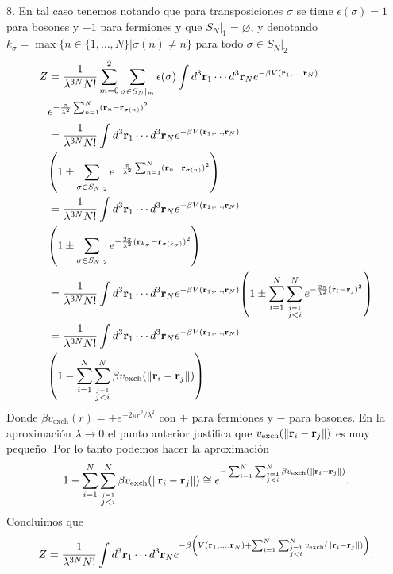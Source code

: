 \documentclass{article}
\begin{document}
8. En tal caso tenemos notando que para transposiciones $\sigma$ se tiene $\epsilon(\sigma)=1$ para bosones y $-1$ para fermiones y que $S_N|_1=\varnothing$, y denotando $k_\sigma=\max\{n\in\{1,\dots,N\}|\sigma(n)\neq n\}$ para todo $\sigma\in S_N|_2$
\begin{align}
\begin{split}
Z&=\frac{1}{\lambda^{3N}N!}\sum_{m=0}^2\sum_{\sigma\in S_N|_m}\epsilon(\sigma)\int d^3\vb{r}_1\cdots d^3\vb{r}_N e^{-\beta V(\vb{r}_1,\dots,\vb{r}_N)}\\
&e^{-\frac{\pi}{\lambda^2}\sum_{n=1}^N(\vb{r}_n-\vb{r}_{\sigma(n)})^2}\\
&=\frac{1}{\lambda^{3N}N!}\int d^3\vb{r}_1\cdots d^3\vb{r}_N e^{-\beta V(\vb{r}_1,\dots,\vb{r}_N)}\\
&\qty(1\pm\sum_{\sigma\in S_N|_2}e^{-\frac{\pi}{\lambda^2}\sum_{n=1}^N(\vb{r}_n-\vb{r}_{\sigma(n)})^2})\\
&=\frac{1}{\lambda^{3N}N!}\int d^3\vb{r}_1\cdots d^3\vb{r}_N e^{-\beta V(\vb{r}_1,\dots,\vb{r}_N)}\\
&\qty(1\pm\sum_{\sigma\in S_N|_2} e^{-\frac{2\pi}{\lambda^2}(\vb{r}_{k_\sigma}-\vb{r}_{\sigma(k_\sigma)})^2})\\
&=\frac{1}{\lambda^{3N}N!}\int d^3\vb{r}_1\cdots d^3\vb{r}_N e^{-\beta V(\vb{r}_1,\dots,\vb{r}_N)}\qty(1\pm\sum_{i=1}^N\sum_{\overset{j=1}{j<i}}^N e^{-\frac{2\pi}{\lambda^2}(\vb{r}_i-\vb{r}_j)^2})\\
&=\frac{1}{\lambda^{3N}N!}\int d^3\vb{r}_1\cdots d^3\vb{r}_N e^{-\beta V(\vb{r}_1,\dots,\vb{r}_N)}\\
&\qty(1-\sum_{i=1}^N\sum_{\overset{j=1}{j<i}}^N \beta v_{\text{exch}}(\|\vb{r}_i-\vb{r}_j\|))\\
\end{split}
\end{align}
Donde $\beta v_{\text{exch}}(r)=\pm e^{-2\pi r^2/\lambda^2}$ con $+$ para fermiones y $-$ para bosones. En la aproximación $\lambda\rightarrow 0$ el punto anterior justifica que $v_{\text{exch}}(\|\vb{r}_i-\vb{r}_j\|)$ es muy pequeño. Por lo tanto podemos hacer la aproximación
\begin{equation}
1-\sum_{i=1}^N\sum_{\overset{j=1}{j<i}}^N \beta v_{\text{exch}}(\|\vb{r}_i-\vb{r}_j\|)\cong e^{-\sum_{i=1}^N\sum_{\overset{j=1}{j<i}}^N \beta v_{\text{exch}}(\|\vb{r}_i-\vb{r}_j\|)}.
\end{equation}
Concluimos que 
\begin{equation}
Z=\frac{1}{\lambda^{3N}N!}\int d^3\vb{r}_1\cdots d^3\vb{r}_N e^{-\beta \qty(V(\vb{r}_1,\dots,\vb{r}_N)+\sum_{i=1}^N\sum_{\overset{j=1}{j<i}}^N v_{\text{exch}}(\|\vb{r}_i-\vb{r}_j\|))}.
\end{equation}
\end{document}

